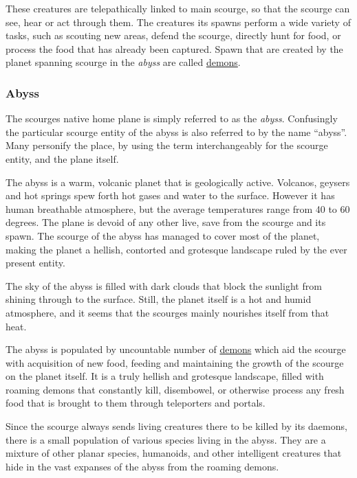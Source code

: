 These creatures are telepathically linked to main scourge, so that the scourge
can see, hear or act through them. The creatures its spawns perform a wide
variety of tasks, such as scouting new areas, defend the scourge, directly
hunt for food, or process the food that has already been captured. Spawn that
are created by the planet spanning scourge in the \emph{abyss} are called
\hyperref[sec:Demons]{demons}.

\subsubsection{Abyss}
\label{sec:Abyss}

The scourges native home plane is simply referred to as the \emph{abyss}.
Confusingly the particular scourge entity of the abyss is also referred to
by the name ``abyss''. Many personify the place, by using the term
interchangeably for the scourge entity, and the plane itself.

The abyss is a warm, volcanic planet that is geologically active. Volcanos,
geysers and hot springs spew forth hot gases and water to the surface. However
it has human breathable atmosphere, but the average temperatures range from 40
to 60 degrees. The plane is devoid of any other live, save from the scourge
and its spawn. The scourge of the abyss has managed to cover most of the
planet, making the planet a hellish, contorted and grotesque landscape ruled
by the ever present entity.

The sky of the abyss is filled with dark clouds that block the sunlight from
shining through to the surface. Still, the planet itself is a hot and humid
atmosphere, and it seems that the scourges mainly nourishes itself from that
heat.

The abyss is populated by uncountable number of \hyperref[sec:Demons]{demons}
which aid the scourge with acquisition of new food, feeding and maintaining
the growth of the scourge on the planet itself. It is a truly hellish and
grotesque landscape, filled with roaming demons that constantly kill,
disembowel, or otherwise process any fresh food that is brought to them through
teleporters and portals.

Since the scourge always sends living creatures there to be killed by its
daemons, there is a small population of various species living in the abyss.
They are a mixture of other planar species, humanoids, and other intelligent
creatures that hide in the vast expanses of the abyss from the roaming demons.

